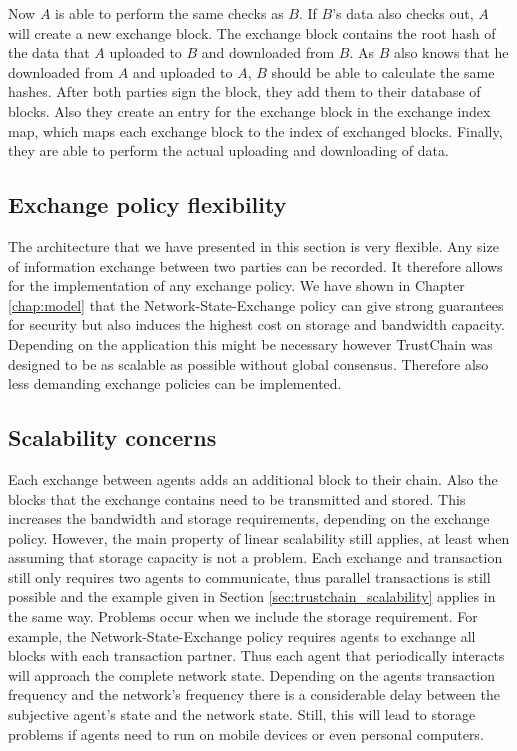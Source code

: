Now $A$ is able to perform the same checks as $B$. If $B$'s data also checks out, $A$ will create 
a new exchange block. The exchange block contains the root hash of the data that $A$ uploaded to $B$ 
and downloaded from $B$. As $B$ also knows that he downloaded from $A$ and uploaded to $A$, $B$ should
be able to calculate the same hashes. After both parties sign the block, they add them to their 
database of blocks. Also they create an entry for the exchange block in the exchange index map, which 
maps each exchange block to the index of exchanged blocks. Finally, they are able to perform the 
actual uploading and downloading of data. 

\subsection{Exchange policy flexibility}
The architecture that we have presented in this section is very flexible. Any size of information 
exchange between two parties can be recorded. It therefore allows for the implementation of any 
exchange policy. We have shown in Chapter \ref{chap:model} that the Network-State-Exchange policy
can give strong guarantees for security but also induces the highest cost on storage and bandwidth 
capacity. Depending on the application this might be necessary however TrustChain was designed to 
be as scalable as possible without global consensus. Therefore also less demanding exchange policies
can be implemented.  

\subsection{Scalability concerns}
Each exchange between agents adds an additional block to their chain. Also the blocks that the 
exchange contains need to be transmitted and stored. This increases the bandwidth and storage 
requirements, depending on the exchange policy. However, the main property of linear scalability 
still applies, at least when assuming that storage capacity is not a problem. Each exchange and 
transaction still only requires two agents to communicate, thus parallel transactions is still 
possible and the example given in Section \ref{sec:trustchain_scalability} applies in the same way.
Problems occur when we include the storage requirement. For example, the Network-State-Exchange policy
requires agents to exchange all blocks with each transaction partner. Thus each agent that periodically
interacts will approach the complete network state. Depending on the agents transaction frequency and
the network's frequency there is a considerable delay between the subjective agent's state and the
network state. Still, this will lead to storage problems if agents need to run on mobile devices or
even personal computers. 

